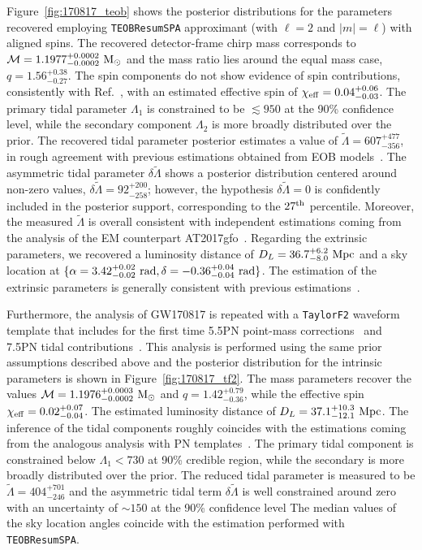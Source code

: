 \documentclass[prd,aps,twocolumn,a4paper,showkeys,nofootinbib,floatfix]{revtex4-1}
\def\M{\mathcal{M}}
\def\Mo{{\rm M_{\odot}}}
\def\tLam{{\tilde\Lambda}}
\def\dLam{{\delta\tilde\Lambda}}
\begin{document}
Figure~\ref{fig:170817_teob} shows the posterior distributions for the parameters
recovered employing
{\tt TEOBResumSPA} approximant (with $\ell=2$ and $|m|=\ell$)
with aligned spins. 
The recovered detector-frame chirp mass corresponds to $\M=1.1977^{+0.0002}_{-0.0002}~\Mo$ and the mass ratio 
lies around the equal mass case, $q=1.56^{+0.38}_{- 0.27}$.
The spin components do not show evidence of spin contributions,
consistently with Ref.~\cite{Abbott:2018wiz},
with an estimated effective spin of $\chi_{\rm eff} = {0.04}^{+0.06}_{-0.03}$.
The primary tidal parameter $\Lambda_1$ is constrained to be 
$\lesssim 950$ at the 90\% confidence level, while the secondary
component $\Lambda_2$ is more broadly distributed
over the prior.
The recovered tidal parameter posterior 
estimates a value of $\tLam={607}^{+477}_{-356}$,
in rough agreement with previous estimations 
obtained from EOB models~\cite{LIGOScientific:2018mvr,Gamba:2020ljo}.
The asymmetric tidal parameter $\dLam$
shows a posterior distribution centered around non-zero values, $\dLam= 92^{+200}_{-258}$; however, the hypothesis $\dLam=0$ is 
confidently included in the posterior support,
corresponding to the $27^{\rm th}$ percentile.
Moreover, the measured $\tLam$ is overall consistent with 
independent estimations coming from the analysis of
the EM counterpart AT2017gfo~\cite{Radice:2017lry,Breschi:2021tbm}.
Regarding the extrinsic parameters,
we recovered a luminosity distance of $D_L=36.7^{+6.2}_{-8.0}~{\rm Mpc}$
and a sky location at
$\{\alpha={3.42}^{+0.02}_{-0.02}~{\rm rad},
\delta={-0.36}^{+0.04}_{-0.04}~{\rm rad}\}$.
The estimation of the extrinsic parameters is generally consistent with previous 
estimations~\cite{Abbott:2018wiz,LIGOScientific:2018mvr,Gamba:2020ljo}.

Furthermore, the analysis of GW170817 is repeated with a
{\tt TaylorF2} waveform template that includes for the first time
5.5PN point-mass corrections~\cite{Messina:2019uby} and 7.5PN tidal
contributions~\cite{Vines:2011ud,Damour:2012yf}.
This analysis is performed 
using the same prior assumptions 
described above and the posterior distribution 
for the intrinsic parameters is shown in Figure~\ref{fig:170817_tf2}.
The mass parameters recover the values $\M={1.1976}^{+0.0003}_{-0.0002}~\Mo$
and $q=1.42^{+0.79}_{-0.36}$, while the effective spin 
$\chi_{\rm eff} = {0.02}^{+0.07}_{-0.04}$.
The estimated luminosity distance of 
$D_L={37.1}^{+10.3}_{-12.1}~{\rm Mpc}$. 
The inference of the tidal components roughly coincides with 
the estimations coming from the analogous analysis with PN templates~\cite{Abbott:2018wiz,LIGOScientific:2018mvr}.
The primary tidal component is constrained below
$\Lambda_1<730$ at 90\% credible region, while the 
secondary is more broadly distributed over the prior. 
The reduced tidal parameter is measured to be $\tLam = {404}^{+701}_{-246}$
and the asymmetric tidal term $\dLam$ is well constrained around zero 
with an uncertainty of ${\sim}150$ at the 90\% confidence level
The median values of the sky location angles 
coincide with the estimation performed with {\tt TEOBResumSPA}.
\end{document}
